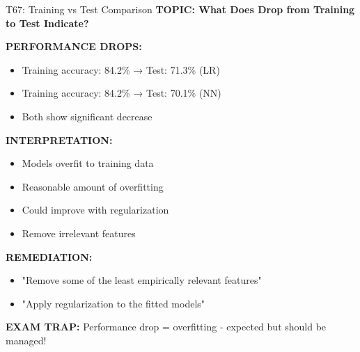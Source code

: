 \documentclass[8pt]{beamer}
\begin{document}
	\begin{frame}{T67: Training vs Test Comparison}
		\fontsize{6.5}{7.5}\selectfont
		\textbf{TOPIC: What Does Drop from Training to Test Indicate?}
		
		\vspace{0.1cm}
		\textbf{PERFORMANCE DROPS:}
		\begin{itemize}
			\item Training accuracy: 84.2\% → Test: 71.3\% (LR)
			\item Training accuracy: 84.2\% → Test: 70.1\% (NN)
			\item Both show significant decrease
		\end{itemize}
		
		\vspace{0.1cm}
		\textbf{INTERPRETATION:}
		\begin{itemize}
			\item Models overfit to training data
			\item Reasonable amount of overfitting
			\item Could improve with regularization
			\item Remove irrelevant features
		\end{itemize}
		
		\vspace{0.1cm}
		\textbf{REMEDIATION:}
		\begin{itemize}
			\item "Remove some of the least empirically relevant features"
			\item "Apply regularization to the fitted models"
		\end{itemize}
		
		\textcolor{myred}{\textbf{EXAM TRAP:}} Performance drop = \textcolor{myblue}{overfitting} - expected but should be managed!
	\end{frame}
	
\end{document}
